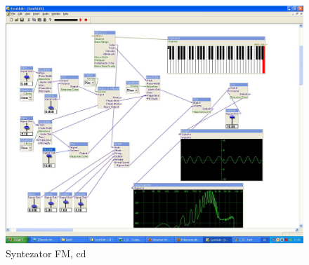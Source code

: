 \documentclass[a4paper,12pt]{article}
\begin{document}
\begin{figure}[h]
\hspace{-2.5cm}
\includegraphics[scale=0.4]{2-03.PNG}
\caption{Syntezator FM, cd}
\label{fig:FM3}
\end{figure}
\end{document}
